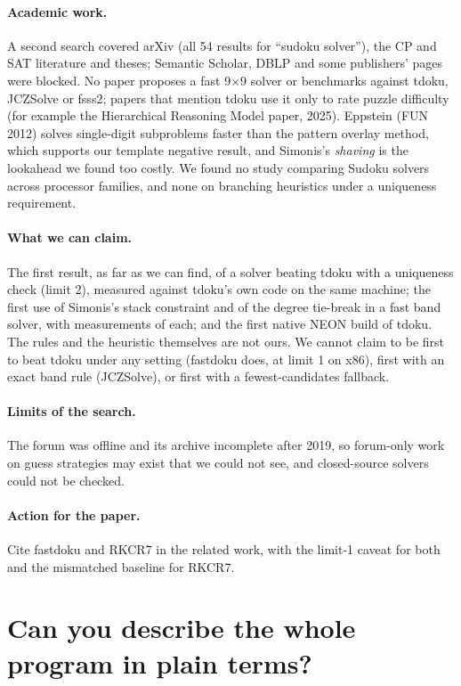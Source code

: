 \documentclass[11pt]{article}
\begin{document}
\paragraph{Academic work.} A second search covered arXiv (all 54 results for ``sudoku solver''), the CP and SAT
literature and theses; Semantic Scholar, DBLP and some publishers' pages were blocked. No paper proposes a fast
9$\times$9 solver or benchmarks against tdoku, JCZSolve or fsss2; papers that mention tdoku use it only to rate puzzle
difficulty (for example the Hierarchical Reasoning Model paper, 2025). Eppstein (FUN 2012) solves single-digit
subproblems faster than the pattern overlay method, which supports our template negative result, and Simonis's
\emph{shaving} is the lookahead we found too costly. We found no study comparing Sudoku solvers across processor
families, and none on branching heuristics under a uniqueness requirement.

\paragraph{What we can claim.} The first result, as far as we can find, of a solver beating tdoku with a uniqueness
check (limit 2), measured against tdoku's own code on the same machine; the first use of Simonis's stack constraint and
of the degree tie-break in a fast band solver, with measurements of each; and the first native NEON build of tdoku. The
rules and the heuristic themselves are not ours. We cannot claim to be first to beat tdoku
under any setting (fastdoku does, at limit 1 on x86), first with an exact band rule (JCZSolve), or first with a
fewest-candidates fallback.

\paragraph{Limits of the search.} The forum was offline and its archive incomplete after 2019, so forum-only work on
guess strategies may exist that we could not see, and closed-source solvers could not be checked.

\paragraph{Action for the paper.} Cite fastdoku and RKCR7 in the related work, with the limit-1 caveat for both and the
mismatched baseline for RKCR7.


\section*{Can you describe the whole program in plain terms?}
\end{document}
